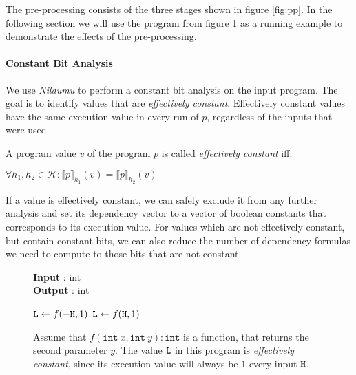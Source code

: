 The pre-processing consists of the three stages shown in figure \ref{fig:pp}. In the following section we will use the program from figure \ref{fig:ec} as a running example to demonstrate the effects of the pre-processing.

\paragraph{Constant Bit Analysis}
We use \emph{Nildumu} \cite{bechberger18} to perform a constant bit analysis on the input program. The goal is to identify values that are \emph{effectively constant}. Effectively constant values have the same execution value in every run of $p$, regardless of the inputs that were used.

\begin{definition}
    A program value $v$ of the program $p$ is called \emph{effectively constant} iff:
    \begin{center}
        $\forall h_1, h_2 \in \mathcal{H}: \llbracket p \rrbracket_{h_1} (v) = \llbracket p \rrbracket_{h_2}(v)$
    \end{center}
\end{definition}

If a value is effectively constant, we can safely exclude it from any further analysis and set its dependency vector to a vector of boolean constants that corresponds to its execution value. For values which are not effectively constant, but contain constant bits, we can also reduce the number of dependency formulas we need to compute to those bits that are not constant.

\begin{figure}
    \centering
    \begin{minipage}{.7\linewidth}
        \begin{algorithm}[H]
            \hspace*{\algorithmicindent} \textbf{Input} \In: int \\
            \hspace*{\algorithmicindent} \textbf{Output} \Out: int \\
            \hspace{1em}
            \begin{algorithmic}[1]
                \State $\mathtt{L} \leftarrow f(-\mathtt{H}, 1)$
                \Else
                \State $\mathtt{L} \leftarrow f(\mathtt{H}, 1)$
                \EndIf
            \end{algorithmic}
        \end{algorithm}
    \end{minipage}
    \caption{Assume that $f(\mathtt{int} \: x, \mathtt{int} \: y): \mathtt{int}$ is a function, that returns the second parameter $y$. The value $\mathtt{L}$ in this program is \emph{effectively constant}, since its execution value will always be $1$ every input $\mathtt{H}$.}
    \label{fig:ec}
\end{figure}

